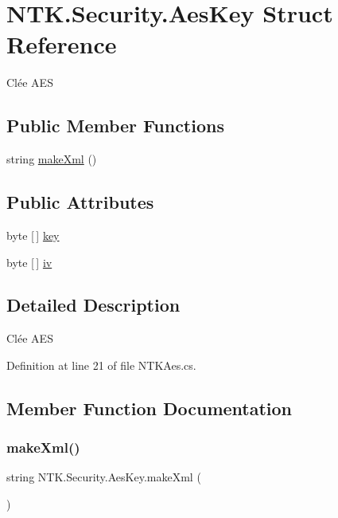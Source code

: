 \hypertarget{struct_n_t_k_1_1_security_1_1_aes_key}{}\section{N\+T\+K.\+Security.\+Aes\+Key Struct Reference}
\label{struct_n_t_k_1_1_security_1_1_aes_key}


Clée A\+ES  


\subsection*{Public Member Functions}
\begin{DoxyCompactItemize}
\item 
string \mbox{\hyperlink{struct_n_t_k_1_1_security_1_1_aes_key_a36c7aef2fb3eb4a7d9d4d6b077fb59de}{make\+Xml}} ()
\end{DoxyCompactItemize}
\subsection*{Public Attributes}
\begin{DoxyCompactItemize}
\item 
byte \mbox{[}$\,$\mbox{]} \mbox{\hyperlink{struct_n_t_k_1_1_security_1_1_aes_key_a6d35e9fbba94bf3fc2e2b0f11ed0b07d}{key}}
\item 
byte \mbox{[}$\,$\mbox{]} \mbox{\hyperlink{struct_n_t_k_1_1_security_1_1_aes_key_ab37083abd6cd0f9e5e6fcc676935f12f}{iv}}
\end{DoxyCompactItemize}


\subsection{Detailed Description}
Clée A\+ES 



Definition at line 21 of file N\+T\+K\+Aes.\+cs.



\subsection{Member Function Documentation}
\mbox{\label{struct_n_t_k_1_1_security_1_1_aes_key_a36c7aef2fb3eb4a7d9d4d6b077fb59de}} 
\subsubsection{\texorpdfstring{makeXml()}{makeXml()}}
{\footnotesize\ttfamily string N\+T\+K.\+Security.\+Aes\+Key.\+make\+Xml (\begin{DoxyParamCaption}{ }\end{DoxyParamCaption})}





